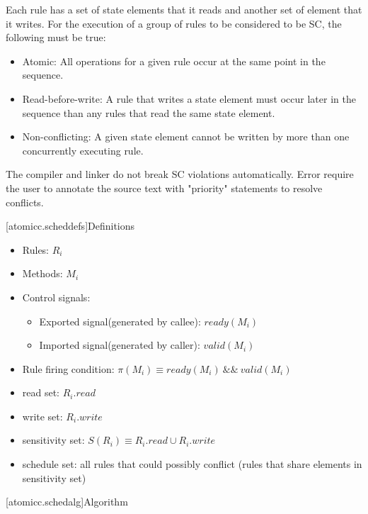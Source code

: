 Each rule has a set of state elements that it reads and another set of element that it writes.
For the execution of a group of rules to be considered to be SC, the following must
be true:

\begin{itemize}
\item Atomic: All operations for a given rule occur at the same point in the sequence.
\item Read-before-write:  A rule that writes a state element must occur later in the sequence
than any rules that read the same state element.
\item Non-conflicting: A given state element cannot be written by more than one concurrently executing rule.
\end{itemize}

The compiler and linker do not break SC violations automatically. Error require the user to annotate
the source text with "priority" statements to resolve conflicts.

[atomicc.scheddefs]{Definitions}
\begin{itemize}
\item Rules: $R_{i}$
\item Methods: $M_{i}$
\item Control signals:
\begin {itemize}
\item Exported signal(generated by callee):  $ready(M_{i})$
\item Imported signal(generated by caller):  $valid(M_{i})$
\end{itemize}
\item Rule firing condition: $\pi(M_{i}) \equiv ready(M_{i})\ \&\&\ valid(M_{i})$
\item read set: $R_{i}.read$
\item write set: $R_{i}.write$
\item sensitivity set: $S(R_{i}) \equiv R_{i}.read \cup R_{i}.write$
\item schedule set: all rules that could possibly conflict (rules that share elements in sensitivity set)
\end{itemize}

[atomicc.schedalg]{Algorithm}

